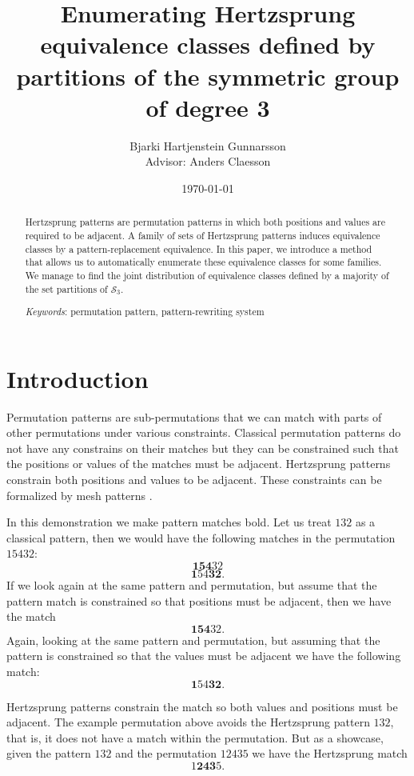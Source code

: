 \documentclass[a4paper, 11pt, english]{article}
\newcommand{\breath}{\vspace{6pt plus 2pt minus 1pt}\noindent}
\theoremstyle{definition}
\newcommand{\Sym}{\mathcal{S}}
\begin{document}
\title{Enumerating Hertzsprung equivalence classes defined by partitions of the symmetric group of degree 3}
\author{Bjarki Hartjenstein Gunnarsson \\[0.6cm]{\small Advisor: Anders Claesson}}
\date{\today}
\maketitle

\begin{abstract}
    Hertzsprung patterns are permutation patterns in which both positions and values are required to
    be adjacent. A family of sets of Hertzsprung patterns induces equivalence classes by
    a pattern-replacement equivalence. In this paper, we introduce a method that allows us 
    to automatically enumerate these equivalence classes for some families. We manage to find the joint
    distribution of equivalence classes defined by a majority of the set partitions of $\Sym_3$.

    \breath \emph{Keywords}: permutation pattern, pattern-rewriting system
\end{abstract}

\section{Introduction}
Permutation patterns are sub-permutations that we can match with parts of other
permutations under various constraints. 
Classical permutation patterns do not have any constrains on their matches but they can
be constrained such that the positions or values of the matches must be adjacent.
Hertzsprung patterns constrain both positions and values to be adjacent. 
These constraints can be formalized by mesh patterns \cite{claesson:2011}.

In this demonstration we make pattern matches bold.  Let us treat $132$ as a classical
pattern, then we would have the following matches in the permutation $15432$:
\[
    \bm{154}32
\]
\[
    \bm{1}54\bm{32}.
\]
If we look again at the same pattern and permutation, but assume that the
pattern match is constrained so that positions must be adjacent, then we have the match
\[
    \bm{154}32.
\]
Again, looking at the same pattern and permutation, but assuming that the
pattern is constrained so that the values must be adjacent we have the following
match:
\[
    \bm{1}54\bm{32}.
\]

Hertzsprung patterns constrain the match so both values and positions must be
adjacent. The example permutation above avoids the Hertzsprung pattern $132$, that is, it does not have a match
within the permutation. But as a showcase, given the pattern $132$ and the permutation $12435$ we
have the Hertzsprung match
\[
    1\bm{243}5.
\]
\end{document}
